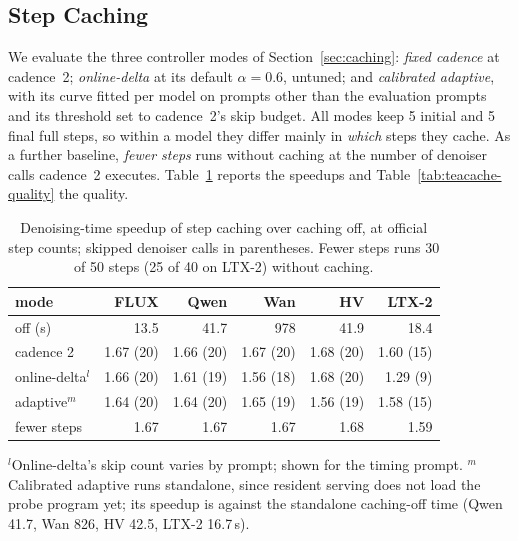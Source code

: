 \subsection{Step Caching}
\label{sec:cache-effectiveness}

We evaluate the three controller modes of Section~\ref{sec:caching}: \emph{fixed cadence} at cadence~2; \emph{online-delta} at its default $\alpha = 0.6$, untuned; and \emph{calibrated adaptive}, with its curve fitted per model on prompts other than the evaluation prompts and its threshold set to cadence~2's skip budget. All modes keep 5 initial and 5 final full steps, so within a model they differ mainly in \emph{which} steps they cache. As a further baseline, \emph{fewer steps} runs without caching at the number of denoiser calls cadence~2 executes. Table~\ref{tab:teacache} reports the speedups and Table~\ref{tab:teacache-quality} the quality.

\begin{table}[t]
\caption{Denoising-time speedup of step caching over caching off, at official step counts; skipped denoiser calls in parentheses. Fewer steps runs 30 of 50 steps (25 of 40 on LTX-2) without caching.}
\label{tab:teacache}
\centering
\footnotesize
\setlength{\tabcolsep}{2.2pt}
\begin{tabular}{@{}lrrrrr@{}}
\toprule
mode & FLUX & Qwen & Wan & HV & LTX-2 \\
\midrule
off (s)                & 13.5 & 41.7 & 978 & 41.9 & 18.4 \\
\midrule
cadence 2              & 1.67 (20) & 1.66 (20) & 1.67 (20) & 1.68 (20) & 1.60 (15) \\
online-delta$^{l}$     & 1.66 (20) & 1.61 (19) & 1.56 (18) & 1.68 (20) & 1.29 (9) \\
adaptive$^{m}$         & 1.64 (20) & 1.64 (20) & 1.65 (19) & 1.56 (19) & 1.58 (15) \\
fewer steps            & 1.67 & 1.67 & 1.67 & 1.68 & 1.59 \\
\bottomrule
\end{tabular}
\par\smallskip
{\raggedright\scriptsize $^{l}$Online-delta's skip count varies by prompt; shown for the timing prompt. $^{m}$Calibrated adaptive runs standalone, since resident serving does not load the probe program yet; its speedup is against the standalone caching-off time (Qwen 41.7, Wan 826, HV 42.5, LTX-2 16.7\,s).\par}
\vskip -0.1in
\end{table}

